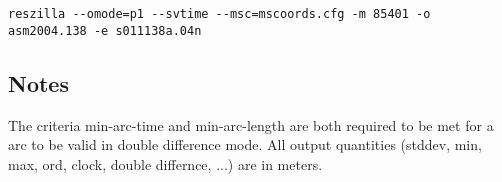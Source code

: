 \documentclass{article}
\begin{document}
\begin{\outputsize}
\begin{lstlisting}
reszilla --omode=p1 --svtime --msc=mscoords.cfg -m 85401 -o asm2004.138 -e s011138a.04n
\end{lstlisting}
\end{\outputsize}

\subsection{Notes}
The criteria min-arc-time and min-arc-length are both required to be met
for a arc to be valid in double difference mode.
All output quantities (stddev, min, max, ord, clock, double differnce, ...)
are in meters.
\end{document}
